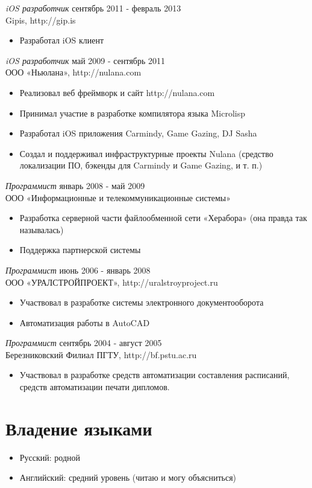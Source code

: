 \documentclass[margin]{res} %
\begin{document}
\begin{resume}
{\sl iOS разработчик} \hfill сентябрь 2011 - февраль 2013 \\
Gipis, http://gip.is 
\begin{itemize} \itemsep -2pt
\item Разработал iOS клиент
\end{itemize}

{\sl iOS разработчик} \hfill май 2009 - сентябрь 2011 \\
ООО «Ньюлана», http://nulana.com
\begin{itemize} 
\item Реализовал веб фреймворк и сайт http://nulana.com
\item Принимал участие в разработке компилятора языка Microlisp 
\item Разработал iOS приложения Carmindy, Game Gazing, DJ Sasha
\item Создал и поддерживал инфраструктурные проекты Nulana (средство локализации ПО, бэкенды для Carmindy и Game Gazing, и т. п.)
\end{itemize} 

{\sl Программист} \hfill январь 2008 - май 2009 \\
ООО «Информационные и телекоммуникационные системы»
\begin{itemize}
\item Разработка серверной части файлообменной сети «Херабора» (она правда так называлась)
\item Поддержка партнерской системы
\end{itemize} 

{\sl Программист} \hfill июнь 2006 - январь 2008 \\
ООО «УРАЛСТРОЙПРОЕКТ», http://uralstroyproject.ru
\begin{itemize}
\item Участвовал в разработке системы электронного документооборота
\item Автоматизация работы в AutoCAD
\end{itemize} 

{\sl Программист} \hfill сентябрь 2004 - август 2005 \\
Березниковский Филиал ПГТУ, http://bf.pstu.ac.ru
\begin{itemize}
\item Участвовал в разработке средств автоматизации составления расписаний, средств автоматизации печати дипломов.
\end{itemize} 

\section{Владение языками}
\begin{itemize}
\item Русский: родной
\item Английский: средний уровень (читаю и могу объясниться)
\end{itemize}


\end{resume}
\end{document}
